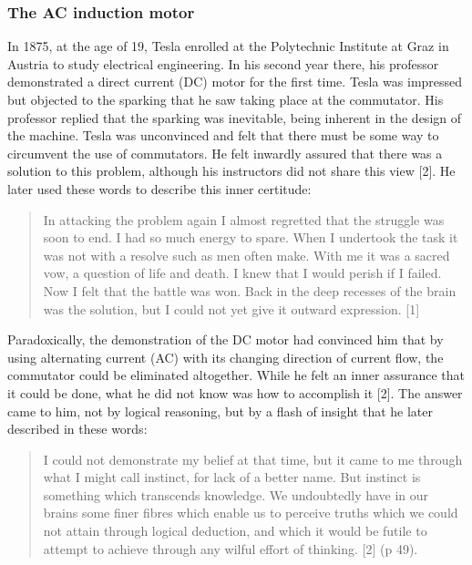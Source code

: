 \documentclass[
  11pt,
  a4paper,
]{article}
\begin{document}
\hypertarget{the-ac-induction-motor}{%
\subsubsection{The AC induction motor}\label{the-ac-induction-motor}}

In 1875, at the age of 19, Tesla enrolled at the Polytechnic Institute
at Graz in Austria to study electrical engineering. In his second year
there, his professor demonstrated a direct current (DC) motor for the
first time. Tesla was impressed but objected to the sparking that he saw
taking place at the commutator. His professor replied that the sparking
was inevitable, being inherent in the design of the machine. Tesla was
unconvinced and felt that there must be some way to circumvent the use
of commutators. He felt inwardly assured that there was a solution to
this problem, although his instructors did not share this view {[}2{]}.
He later used these words to describe this inner certitude:

\begin{quote}
In attacking the problem again I almost regretted that the struggle was
soon to end. I had so much energy to spare. When I undertook the task it
was not with a resolve such as men often make. With me it was a sacred
vow, a question of life and death. I knew that I would perish if I
failed. Now I felt that the battle was won. Back in the deep recesses of
the brain was the solution, but I could not yet give it outward
expression. {[}1{]}
\end{quote}

Paradoxically, the demonstration of the DC motor had convinced him that
by using alternating current (AC) with its changing direction of current
flow, the commutator could be eliminated altogether. While he felt an
inner assurance that it could be done, what he did not know was how to
accomplish it {[}2{]}. The answer came to him, not by logical reasoning,
but by a flash of insight that he later described in these words:

\begin{quote}
I could not demonstrate my belief at that time, but it came to me
through what I might call instinct, for lack of a better name. But
instinct is something which transcends knowledge. We undoubtedly have in
our brains some finer fibres which enable us to perceive truths which we
could not attain through logical deduction, and which it would be futile
to attempt to achieve through any wilful effort of thinking. {[}2{]} (p
49).
\end{quote}
\end{document}

